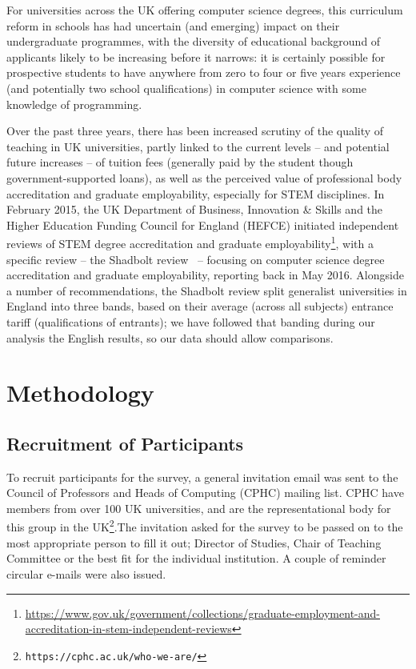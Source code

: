 \documentclass{sig-alternate}
\begin{document}
For universities across the UK offering computer science degrees, this
curriculum reform in schools has had uncertain (and emerging) impact
on their undergraduate programmes, with the diversity of educational
background of applicants likely to be increasing before it narrows: it
is certainly possible for prospective students to have anywhere from
zero to four or five years experience (and potentially two school
qualifications) in computer science with some knowledge of
programming.

Over the past three years, there has been increased scrutiny of the
quality of teaching in UK universities, partly linked to the current
levels -- and potential future increases -- of tuition fees (generally
paid by the student though government-supported loans), as well as the
perceived value of professional body accreditation and graduate
employability, especially for STEM disciplines. In February 2015, the
UK Department of Business, Innovation \& Skills and the Higher
Education Funding Council for England (HEFCE) initiated independent
reviews of STEM degree accreditation and graduate
employability\footnote{\url{https://www.gov.uk/government/collections/graduate-employment-and-accreditation-in-stem-independent-reviews}},
with a specific review -- the Shadbolt review~\cite{shadbolt:2016} --
focusing on computer science degree accreditation and graduate
employability, reporting back in May 2016. Alongside a number of
recommendations, the Shadbolt review split generalist universities in
England into three bands, based on their average (across all subjects)
entrance tariff (qualifications of entrants); we have followed that
banding during our analysis the English results, so our data should
allow comparisons.



\section{Methodology}\label{method}

\subsection{Recruitment of Participants}

To recruit participants for the survey, a general invitation email was
sent to the Council of Professors and Heads of Computing (CPHC)
mailing list. CPHC have members from over 100 UK universities, and are
the representational body for this group in the
UK\footnote{\texttt{https://cphc.ac.uk/who-we-are/}}.The invitation
asked for the survey to be passed on to the most appropriate person to
fill it out; Director of Studies, Chair of Teaching Committee or the
best fit for the individual institution. A couple of reminder circular
e-mails were also issued.
\end{document}
